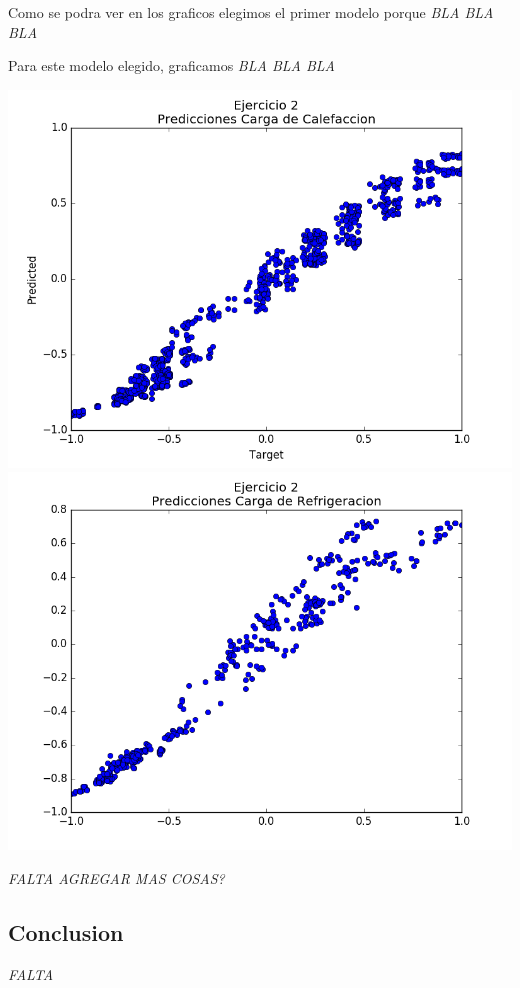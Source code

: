 Como se podra ver en los graficos elegimos el primer modelo porque \emph{\color{red} BLA BLA BLA}


Para este modelo elegido, graficamos \emph{\color{red} BLA BLA BLA}

\includegraphics[scale=0.4]{img/ej2-calef}
\includegraphics[scale=0.4]{img/ej2-refrig}


\emph{\color{red} FALTA AGREGAR MAS COSAS?}
\subsection{Conclusion}

\emph{\color{red} FALTA }
